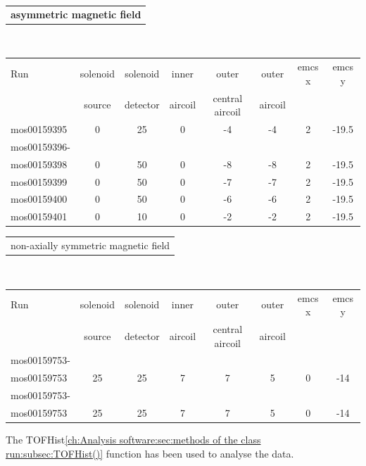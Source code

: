   \begin{table}
	\centering
  	\begin{tabular}{c}
  	
  		{\bf asymmetric magnetic field}\\
	\end{tabular}\\
  	\begin{tabular}{|l|ccccccc|}
		\hline
		\centering
		
		Run &  solenoid &solenoid &inner & outer &outer &emcs x	&emcs y\\
		  & 	source	& detector & aircoil & central aircoil & aircoil& &\\
  		\hline
  		mos00159395& 0&	25&	0&	-4&	-4&	2&	-19.5\\
  		\hline
  		mos00159396-&&&&&&&\\
  		mos00159398 & 0 & 50& 0 & -8 & -8 & 2 & -19.5\\
  		mos00159399 & 0 & 50& 0 & -7 & -7 & 2 & -19.5\\
  		\hline
  		mos00159400 & 0 & 50& 0 & -6 & -6 & 2 & -19.5\\
  		\hline
		mos00159401 & 0 & 10& 0 & -2 & -2 & 2 & -19.5\\
		\hline
		

  		
  	\end{tabular}
  	
  	\begin{tabular}{c}
		non-axially symmetric magnetic field\\
	\end{tabular}\\
  	\begin{tabular}{|l|ccccccc|}
		\hline
		\centering
		
		Run &  solenoid &solenoid &inner & outer &outer &emcs x	&emcs y\\
		  & 	source	& detector & aircoil & central aircoil & aircoil& &\\
  		\hline
  		mos00159753- &&&&&&&\\
  		mos00159753 &25	&25	&7	&7	&5	&0	&-14\\
  		\hline
  		mos00159753- &&&&&&&\\
  		mos00159753 &25	&25	&7	&7	&5	&0	&-14\\
		

  		
  	\end{tabular}
  	\end{table}
  The TOFHist\ref{ch:Analysis software:sec:methods of the class run:subsec:TOFHist()} function has been used to analyse the data.
